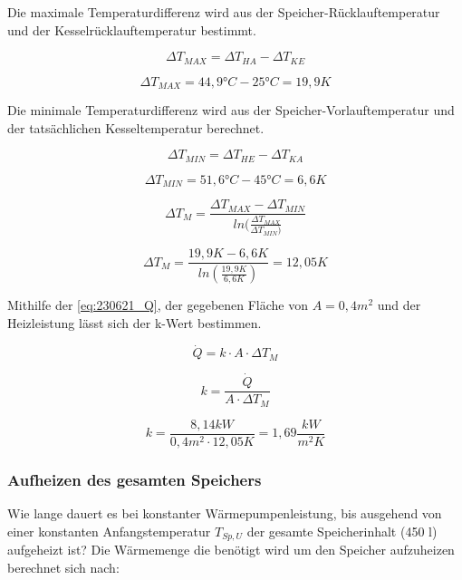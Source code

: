 Die maximale Temperaturdifferenz wird aus der Speicher-Rücklauftemperatur und der Kesselrücklauftemperatur bestimmt.

\begin{equation}
    \Delta T_{MAX}= \Delta T_{HA}-\Delta T_{KE}
    \label{eq:230621_DeltaTMAX}
\end{equation}



$$\Delta T_{MAX}= 44,9\text{°}C-25 \text{°} C= 19,9K$$

Die minimale Temperaturdifferenz wird aus der Speicher-Vorlauftemperatur und der tatsächlichen Kesseltemperatur berechnet.

\begin{equation}
    \Delta T_{MIN}= \Delta T_{HE}-\Delta T_{KA}
    \label{eq:230621_DeltaTMIN}
\end{equation}

$$\Delta T_{MIN}= 51,6 \text{°} C-45 \text{°} C= 6,6K$$

\begin{equation}
    \Delta T_{M}= \frac{\Delta T_{MAX}-\Delta T_{MIN}}{ln(\frac{\Delta T_{MAX}}{\Delta T_{MIN})}}
    \label{eq:230621_DeltaTM}
\end{equation}

$$\Delta T_M= \frac{19,9K-6,6K}{ln(\frac{19,9K}{6,6K})}= 12,05K$$

Mithilfe der \autoref{eq:230621_Q}, der gegebenen Fläche von $A= 0,4m^2$ und der Heizleistung lässt sich der k-Wert bestimmen.

\begin{equation}
    \dot{Q}=k\cdot A \cdot \Delta T_M
    \label{eq:230621_Q}
\end{equation}

\begin{equation}
    k = \frac{\dot{Q}}{ A \cdot \Delta T_M} 
    \label{eq:230621_k}
\end{equation}

$$k=\frac{8,14 kW}{ 0,4m^2 \cdot 12,05K}=1,69 \frac{kW}{m^2K}$$

\subsubsection{Aufheizen des gesamten Speichers}
Wie lange dauert es bei konstanter Wärmepumpenleistung, bis ausgehend von einer
konstanten Anfangstemperatur \texorpdfstring{$T_{Sp,U}$}{} der gesamte Speicherinhalt (450 l) aufgeheizt ist?
Die Wärmemenge die benötigt wird um den Speicher aufzuheizen berechnet sich nach:

